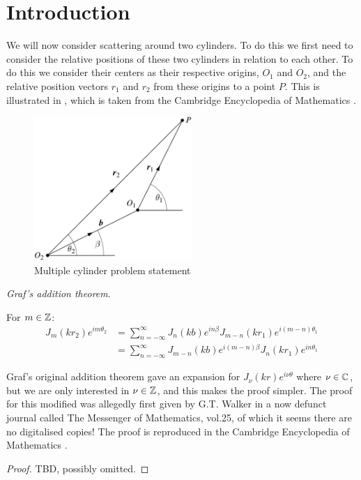 \section{Introduction}
We will now consider scattering around two cylinders. To do this we first need to consider the relative positions of these two cylinders in relation to each other. To do this we consider their centers as their respective origins, $O_1$ and $O_2$, and the relative position vectors $r_1$ and $r_2$ from these origins to a point $P$. This is illustrated in , which is taken from the Cambridge Encyclopedia of Mathematics \parencite{martin06scattering}. \par
%
  \begin{figure} \centering
    \includegraphics[width=6cm]{prob3/prob3_figures/scattering_fig21.png}
    \caption{Multiple cylinder problem statement}\label{fig:problem_3}
  \end{figure}
%
  \begin{thm} \emph{Graf's addition theorem}. \par
    For $m \in \mathbb{Z}$:
      \begin{align*}
        J_m(kr_2)e^{im\theta_2} &= \sum^\infty_{n=-\infty} J_n (kb) e^{in\beta} J_{m-n} (kr_1) e^{i(m-n)\theta_1} \\
          & = \sum^\infty_{n=-\infty} J_{m-n} (kb) e^{i(m-n)\beta} J_n (kr_1) e^{in\theta_1}
        \end{align*}
  \end{thm}\par
%
Graf's original addition theorem gave an expansion for $J_\nu(kr)e^{i\nu\theta}$ where $\nu \in \mathbb{C}$, but we are only interested in $\nu \in \mathbb{Z}$, and this makes the proof simpler. The proof for this modified was allegedly first given by G.T. Walker in a now defunct journal called The Messenger of Mathematics, vol.25, of which it seems there are no digitalised copies! The proof is reproduced in the Cambridge Encyclopedia of Mathematics \parencite{martin06scattering}.
%
  \begin{proof} TBD, possibly omitted.
  \end{proof}
